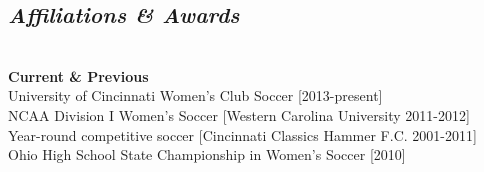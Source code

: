 \documentclass{res}
\begin{document}
\begin{minipage}[t][0pt]{\linewidth}
{\begin{resume}
\section{\sl \large Affiliations \& Awards} \\
{\bf Current \& Previous}\\
University of Cincinnati Women’s Club Soccer [2013-present]\\
NCAA Division I Women’s Soccer [Western Carolina University 2011-2012]\\
Year-round competitive soccer [Cincinnati Classics Hammer F.C. 2001-2011]\\
Ohio High School State Championship in Women’s Soccer [2010]\\  

\end{resume} 

\vfill} %

\end{minipage}
\end{document}
